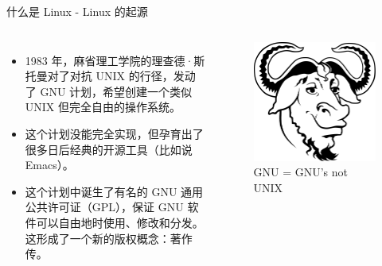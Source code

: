 \documentclass[UTF8]{ctexbeamer}
\begin{document}
\begin{frame}{什么是 Linux - Linux 的起源}
    \begin{columns}
    \begin{itemize}
        \item 1983 年，麻省理工学院的理查德·斯托曼对了对抗 UNIX 的行径，发动了 GNU 计划，希望创建一个类似 UNIX 但完全自由的操作系统。
        \item 这个计划没能完全实现，但孕育出了很多日后经典的开源工具（比如说 Emacs）。
        \item 这个计划中诞生了有名的 GNU 通用公共许可证（GPL），保证 GNU 软件可以自由地时使用、修改和分发。这形成了一个新的版权概念：著作传。
    \end{itemize}
    \begin{figure}
        \centering
        \includegraphics[width=\textwidth]{GNU.png}
        \caption{GNU = GNU's not UNIX}
        \label{fig:gnu}
    \end{figure}
    \end{columns}
\end{frame}
\end{document}
